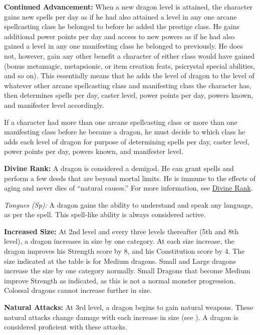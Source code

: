 {
\textbf{Continued Advancement:} When a new dragon level is attained, the character gains new spells per day as if he had also attained a level in any one arcane spellcasting class he belonged to before he added the prestige class. He gains additional power points per day and access to new powers as if he had also gained a level in any one manifesting class he belonged to previously. He does not, however, gain any other benefit a character of either class would have gained (bonus metamagic, metapsionic, or item creation feats, psicrystal special abilities, and so on). This essentially means that he adds the level of dragon to the level of whatever other arcane spellcasting class and manifesting class the character has, then determines spells per day, caster level, power points per day, powers known, and manifester level accordingly.

If a character had more than one arcane spellcasting class or more than one manifesting class before he became a dragon, he must decide to which class he adds each level of dragon for purpose of determining spells per day, caster level, power points per day, powers known, and manifester level.

\textbf{Divine Rank:} A dragon is considered a demigod. He can grant spells and perform a few deeds that are beyond mortal limits. He is immune to the effects of aging and never dies of ``natural causes.'' For more information, see \hyperref[Divine Rank]{Divine Rank}.

\textit{Tongues (Sp):} A dragon gains the ability to understand and speak any language, as per the  spell. This spell-like ability is always considered active.


\textbf{Increased Size:} At 2nd level and every three levels thereafter (5th and 8th level), a dragon increases in size by one category. At each size increase, the dragon improves his Strength score by 8, and his Constitution score by 4. The size indicated at the table is for Medium dragons. Small and Large dragons increase the size by one category normally. Small Dragons that become Medium improve Strength as indicated, as this is not a normal monster progression. Colossal dragons cannot increase further in size.

\textbf{Natural Attacks:} At 3rd level, a dragon begins to gain natural weapons. These natural attacks change damage with each increase in size (see ). A dragon is considered proficient with these attacks.

}
